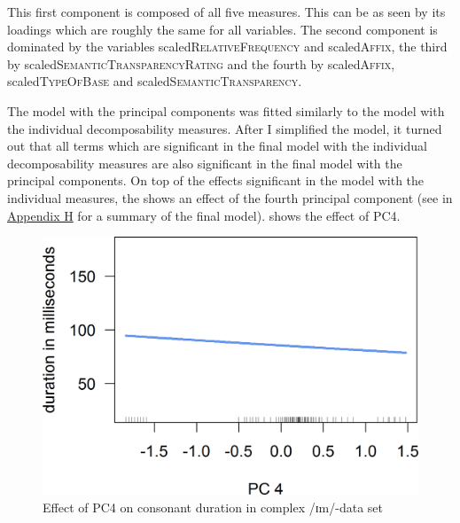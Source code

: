 This first component is composed of all five measures. This can be as seen by its loadings which are roughly the same for all variables. The second component is dominated by the variables scaled\textsc{RelativeFrequency} and scaled\textsc{Affix}, the third by scaled\textsc{SemanticTransparencyRating} and the fourth by scaled\textsc{Affix}, scaled\textsc{TypeOfBase} and scaled\textsc{SemanticTransparency}. 


The model with the principal components was fitted similarly to the model with the individual decomposability measures. After I simplified the model, it turned out that all terms which are significant in the final model with the individual decomposability measures are also significant in the final model with the principal components. On top of the effects significant in the model with the individual measures, the  shows an effect of the fourth principal component (see  in \hyperref[Appendix H: Model Summaries Experiment]{Appendix H} for a summary of the final model).  shows the effect of \textsc{PC4}.

\begin{figure} 
	

	\includegraphics [scale=0.5] {images/Experiment/imModelPC}
	\caption{Effect of PC4 on consonant duration in complex /ɪm/-data set}
	\label{fig:PC 4 imComplex experiment}

\end{figure}



